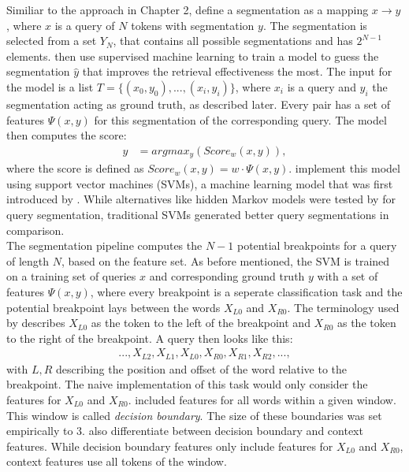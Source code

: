 Similiar to the approach in Chapter 2, \citeauthor{Bergsma:2007} define a segmentation as a mapping $x \to y$, where $x$ is a query of $N$ tokens with segmentation $y$. The segmentation is selected from a set $Y_N$, that contains all possible segmentations and has $2^{N-1}$ elements. \citeauthor{Bergsma:2007} then use supervised machine learning to train a model to guess the segmentation $\hat{y}$ that improves the retrieval effectiveness the most. The input for the model is a list $T = \{(x_0, y_0), ..., (x_i, y_i)\}$, where $x_i$ is a query and $y_i$ the segmentation acting as ground truth, as described later. Every pair has a set of features $\Psi(x,y)$ for this segmentation of the corresponding query. The model then computes the score:
\begin{align*}
	\hat{y} &= argmax_y(Score_w(x,y)),
\end{align*}
where the score is defined as $Score_w(x,y) = w \cdot \Psi(x,y)$. \citeauthor{Bergsma:2007} implement this model using support vector machines (SVMs), a machine learning model that was first introduced by \citet{Joachims:2002}. While alternatives like hidden Markov models were tested by \citeauthor{Bergsma:2007} for query segmentation, traditional SVMs generated better query segmentations in comparison.\\

The segmentation pipeline computes the $N-1$ potential breakpoints for a query of length $N$, based on the feature set. As before mentioned, the SVM is trained on a training set of queries $x$ and corresponding ground truth $y$ with a set of features $\Psi(x,y)$, where every breakpoint is a seperate classification task and the potential breakpoint lays between the words $X_{L0}$ and $X_{R0}$. The terminology used by \citeauthor{Bergsma:2007} describes $X_{L0}$ as the token to the left of the breakpoint and $X_{R0}$ as the token to the right of the breakpoint. A query then looks like this:
\begin{align*}
..., X_{L2}, X_{L1}, X_{L0}, X_{R0}, X_{R1}, X_{R2},...,
\end{align*}
with $L,R$ describing the position and offset of the word relative to the breakpoint. The naive implementation of this task would only consider the features for $X_{L0}$ and $X_{R0}$. \citeauthor{Bergsma:2007} included features for all words within a given window. This window is called \textit{decision boundary}. The size of these boundaries was set empirically to 3.
\citeauthor{Bergsma:2007} also differentiate between decision boundary and context features. While decision boundary features only include features for $X_{L0}$ and $X_{R0}$, context features use all tokens of the window.

